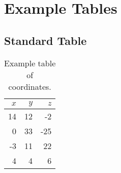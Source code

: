 
\chapter{Example Tables}


\section{Standard Table}
\label{sec:table_examples}
\begin{table}
  \centering
  \begin{tabular}{|rr|r|}
    \hline
    $x$ & $y$ & $z$ \\
    \hline
    14 & 12 & -2 \\
    0 & 33 & -25 \\
    -3 & 11 & 22 \\
    4 & 4 & 6 \\
    \hline
  \end{tabular}
  \caption{Example table of coordinates.}
  \label{tab:coordinates}
\end{table}

